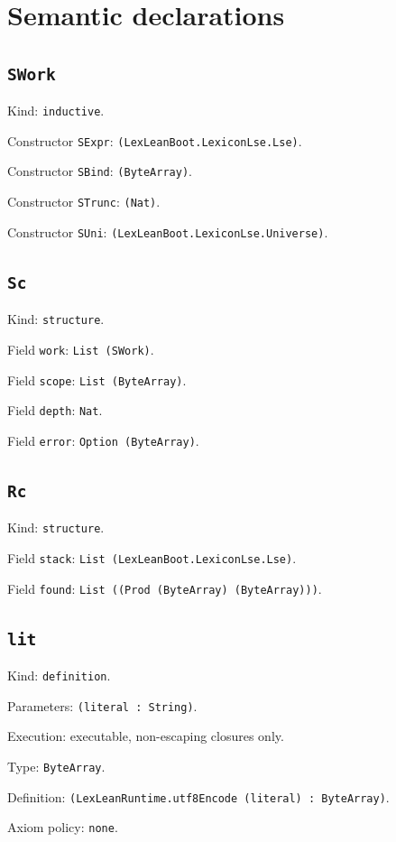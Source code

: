 \documentclass[11pt]{article}
\begin{document}
\section*{Semantic declarations}
\subsection*{\texttt{SWork}}
\noindent Kind: \texttt{inductive}.\par
\noindent Constructor \texttt{SExpr}: \texttt{(LexLeanBoot.LexiconLse.Lse)}.\par
\noindent Constructor \texttt{SBind}: \texttt{(ByteArray)}.\par
\noindent Constructor \texttt{STrunc}: \texttt{(Nat)}.\par
\noindent Constructor \texttt{SUni}: \texttt{(LexLeanBoot.LexiconLse.Universe)}.\par
\subsection*{\texttt{Sc}}
\noindent Kind: \texttt{structure}.\par
\noindent Field \texttt{work}: \texttt{List (SWork)}.\par
\noindent Field \texttt{scope}: \texttt{List (ByteArray)}.\par
\noindent Field \texttt{depth}: \texttt{Nat}.\par
\noindent Field \texttt{error}: \texttt{Option (ByteArray)}.\par
\subsection*{\texttt{Rc}}
\noindent Kind: \texttt{structure}.\par
\noindent Field \texttt{stack}: \texttt{List (LexLeanBoot.LexiconLse.Lse)}.\par
\noindent Field \texttt{found}: \texttt{List ((Prod (ByteArray) (ByteArray)))}.\par
\subsection*{\texttt{lit}}
\noindent Kind: \texttt{definition}.\par
\noindent Parameters: \texttt{(literal : String)}.\par
\noindent Execution: executable, non-escaping closures only.\par
\noindent Type: \texttt{ByteArray}.\par
\noindent Definition: \texttt{(LexLeanRuntime.utf8Encode (literal) : ByteArray)}.\par
\noindent Axiom policy: \texttt{none}.\par
\end{document}
